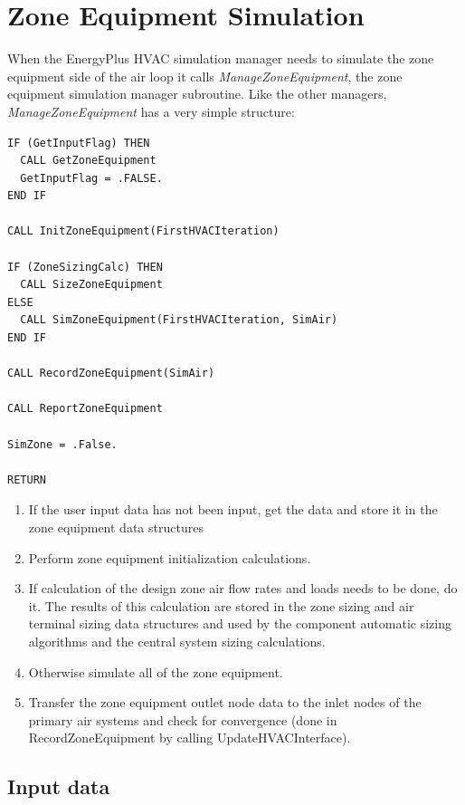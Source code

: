 \section{Zone Equipment Simulation}\label{zone-equipment-simulation}

When the EnergyPlus HVAC simulation manager needs to simulate the zone equipment side of the air loop it calls \emph{ManageZoneEquipment}, the zone equipment simulation manager subroutine. Like the other managers, \emph{ManageZoneEquipment} has a very simple structure:

\begin{lstlisting}
IF (GetInputFlag) THEN
  CALL GetZoneEquipment
  GetInputFlag = .FALSE.
END IF

CALL InitZoneEquipment(FirstHVACIteration)

IF (ZoneSizingCalc) THEN
  CALL SizeZoneEquipment
ELSE
  CALL SimZoneEquipment(FirstHVACIteration, SimAir)
END IF

CALL RecordZoneEquipment(SimAir)

CALL ReportZoneEquipment

SimZone = .False.

RETURN
\end{lstlisting}

\begin{enumerate}
\def\labelenumi{\arabic{enumi}.}
\item
  If the user input data has not been input, get the data and store it in the zone equipment data structures
\item
  Perform zone equipment initialization calculations.
\item
  If calculation of the design zone air flow rates and loads needs to be done, do it. The results of this calculation are stored in the zone sizing and air terminal sizing data structures and used by the component automatic sizing algorithms and the central system sizing calculations.
\item
  Otherwise simulate all of the zone equipment.
\item
  Transfer the zone equipment outlet node data to the inlet nodes of the primary air systems and check for convergence (done in RecordZoneEquipment by calling UpdateHVACInterface).
\end{enumerate}

\subsection{Input data}\label{input-data-000}

